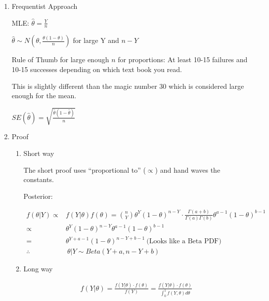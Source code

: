 \documentclass[11pt]{article}
\begin{document}
\begin{enumerate}
\item Frequentist Approach
\label{sec:org5a35352}

MLE: \(\hat \theta = \frac{Y}{n}\)

\(\hat \theta \sim N(\theta, \frac{\theta (1 - \theta)}{n})\) for large Y and \(n -Y\)

Rule of Thumb for large enough \(n\) for proportions: At least 10-15 failures and 10-15 successes
depending on which text book you read.

This is slightly different than the magic number 30 which is considered large
enough for the mean.


\(SE(\hat \theta) = \sqrt{\frac{\hat \theta (1 - \hat \theta)}{n}}\)

\item Proof
\label{sec:org5e52b85}


\begin{enumerate}
\item Short way
\label{sec:orgd3ba7ad}

The short proof uses ``proportional to'' (\(\propto\)) and hand waves the constants.


Posterior:

\begin{equation}
\begin{split}
f(\theta | Y) \propto & f(Y | \theta) f(\theta) = {n \choose Y} \theta^Y (1 - \theta)^{n - Y} \cdot \frac{\Gamma (a + b)}{\Gamma (a) \Gamma (b)} \theta^{a - 1} (1 - \theta)^{b - 1}\\
\propto & \theta^Y (1 - \theta)^{n - Y} \theta^{a - 1} (1 - \theta)^{b - 1}\\
= & \theta^{Y + a - 1} (1 - \theta)^{n - Y + b - 1} \label{eq:1} \ \text{(Looks like a Beta PDF)}\\
\therefore & \ \theta | Y \sim Beta(Y + a, n - Y + b)
\end{split}
\end{equation}


\item Long way
\label{sec:orgf5b0edb}

\begin{equation}
\begin{split}
f(Y | \theta) = \frac{f(Y | \theta) \cdot f(\theta)}{f(Y)} =  \frac{f(Y | \theta) \cdot f(\theta)}{\int_{0}^{1} f(Y, \theta) d \theta}
\end{split}
\end{equation}


\end{enumerate}
\end{enumerate}
\end{document}
